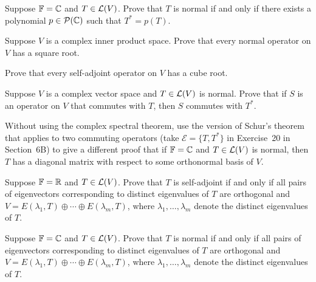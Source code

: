 \begin{exc}
\begin{exercise}
Suppose $\mathbb{F}=\mathbb{C}$ and $T\in\mathcal{L}(V)$. Prove that $T$ is normal if and only if
there exists a polynomial $p\in\mathcal{P}(\mathbb{C})$ such that $T^*=p(T)$.
\end{exercise}

\begin{exercise}
Suppose $V$ is a complex inner product space. Prove that every normal operator
on $V$ has a square root.
\end{exercise}

\begin{exercise}
Prove that every self-adjoint operator on $V$ has a cube root.
\end{exercise}

\begin{exercise}
Suppose $V$ is a complex vector space and $T\in\mathcal{L}(V)$ is normal. Prove that
if $S$ is an operator on $V$ that commutes with $T$, then $S$ commutes with
$T^*$.
\end{exercise}

\begin{exercise}
Without using the complex spectral theorem, use the version of Schur's theorem
that applies to two commuting operators (take $\mathcal{E}=\{T,T^*\}$ in
Exercise~20 in Section~6B) to give a different proof that if $\mathbb{F}=\mathbb{C}$ and
$T\in\mathcal{L}(V)$ is normal, then $T$ has a diagonal matrix with respect to some
orthonormal basis of $V$.
\end{exercise}

\begin{exercise}
Suppose $\mathbb{F}=\mathbb{R}$ and $T\in\mathcal{L}(V)$. Prove that $T$ is self-adjoint if and only
if all pairs of eigenvectors corresponding to distinct eigenvalues of $T$ are
orthogonal and $V=E(\lambda_1,T)\oplus\cdots\oplus E(\lambda_m,T)$, where
$\lambda_1,\dots,\lambda_m$ denote the distinct eigenvalues of $T$.
\end{exercise}

\begin{exercise}
Suppose $\mathbb{F}=\mathbb{C}$ and $T\in\mathcal{L}(V)$. Prove that $T$ is normal if and only if all
pairs of eigenvectors corresponding to distinct eigenvalues of $T$ are
orthogonal and $V=E(\lambda_1,T)\oplus\cdots\oplus E(\lambda_m,T)$, where
$\lambda_1,\dots,\lambda_m$ denote the distinct eigenvalues of $T$.
\end{exercise}


\end{exc}
